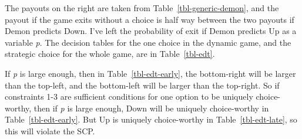 \documentclass[
  10pt,
  letterpaper,
  DIV=11,
  numbers=noendperiod,
  twoside]{scrartcl}
\begin{document}
The payouts on the right are taken from Table~\ref{tbl-generic-demon},
and the payout if the game exits without a choice is half way between
the two payouts if Demon predicts Down. I've left the probability of
exit if Demon predicts Up as a variable \emph{p}. The decision tables
for the one choice in the dynamic game, and the strategic choice for the
whole game, are in Table~\ref{tbl-edt}.

\begin{table}

\caption{\label{tbl-edt}Payout tables for Figure~\ref{fig-edt}.}

\begin{minipage}{0.50\linewidth}



\end{minipage}%
%
\begin{minipage}{0.50\linewidth}



\end{minipage}%

\end{table}%

If \emph{p} is large enough, then in Table~\ref{tbl-edt-early}, the
bottom-right will be larger than the top-left, and the bottom-left will
be larger than the top-right. So if constraints 1-3 are sufficient
conditions for one option to be uniquely choice-worthy, then if \emph{p}
is large enough, Down will be uniquely choice-worthy in
Table~\ref{tbl-edt-early}. But Up is uniquely choice-worthy in
Table~\ref{tbl-edt-late}, so this will violate the SCP.
\end{document}
